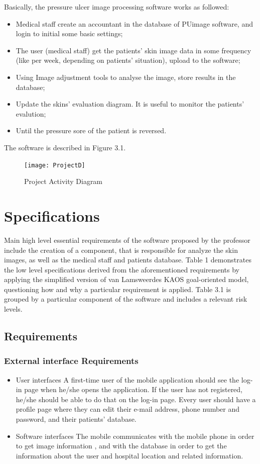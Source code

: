 Basically, the pressure ulcer image processing software works as followed: 
\begin{itemize}
\item Medical staff create an accountant in the database of PUimage software, and login to initial some basic settings;
\item The user (medical staff) get the patients' skin image data in some frequency (like per week, depending on patients' situation), upload to the software;
\item Using Image adjustment tools to analyse the image, store results in the database;
\item Update the skins' evaluation diagram. It is useful to monitor the patients' evalution;
\item Until the pressure sore of the patient is reversed.
\end{itemize}
The software is described in Figure 3.1.
\begin{figure}
	\centering
	\texttt{[image: ProjectD]}
	\caption{Project Activity Diagram}
\end{figure}

\section{Specifications} 
Main high level essential requirements of the software proposed by the professor include the creation of a component, that is responsible for analyze the skin images, as well as the medical staff and patients database. Table 1 demonstrates the low level specifications derived from the aforementioned requirements by applying the simplified version of van Lamsweerde\textquotesingle s KAOS goal-oriented model, questioning how and why a particular requirement is applied. Table 3.1 is grouped by a particular component of the software and includes a relevant risk levels.\\
\subsection{Requirements}
\subsubsection{External interface Requirements}
\begin{itemize}
\item{User interfaces}
A first-time user of the mobile application should see the log-in page when he/she opens the application. If the user has not registered, he/she should be able to do that on the log-in page. Every user should have a profile page where they can edit their e-mail address, phone number and password, and their patients' database.
\item{Software interfaces}
The mobile communicates with the mobile phone in order to get image information
, and with the database in order to get the information about the user and hospital location and related information.
\end{itemize}
